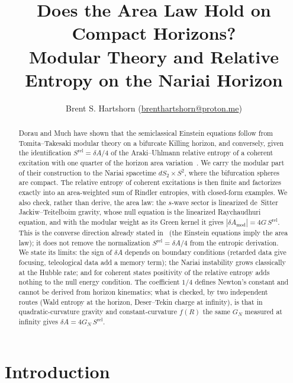 \documentclass[11pt]{article}
\title{\textbf{Does the Area Law Hold on Compact Horizons?}\\ 
Modular Theory and Relative Entropy on the Nariai Horizon}
\author{Brent S. Hartshorn \orcidlink{0009-0004-2853-655X} (\url{brenthartshorn@proton.me})}
\newcommand{\Srel}{S^{\mathrm{rel}}}
\begin{document}
\maketitle

\begin{abstract}
Dorau and Much have shown that the semiclassical Einstein equations follow from Tomita--Takesaki modular theory on a bifurcate Killing horizon, and conversely, given the identification $\Srel = \delta A/4$ of the Araki--Uhlmann relative entropy of a coherent excitation with one quarter of the horizon area variation~\cite{DorauMuch}. We carry the modular part of their construction to the Nariai spacetime $dS_2\times S^2$, where the bifurcation spheres are compact. The relative entropy of coherent excitations is then finite and factorizes exactly into an area-weighted sum of Rindler entropies, with closed-form examples. We also check, rather than derive, the area law: the $s$-wave sector is linearized de~Sitter Jackiw--Teitelboim gravity, whose null equation is the linearized Raychaudhuri equation, and with the modular weight as its Green kernel it gives $|\delta A_{\mathrm{mod}}| = 4G\,\Srel$. This is the converse direction already stated in~\cite{DorauMuch} (the Einstein equations imply the area law); it does not remove the normalization $\Srel = \delta A/4$ from the entropic derivation. We state its limits: the sign of $\delta A$ depends on boundary conditions (retarded data give focusing, teleological data add a memory term); the Nariai instability grows classically at the Hubble rate; and for coherent states positivity of the relative entropy adds nothing to the null energy condition. The coefficient $1/4$ defines Newton's constant and cannot be derived from horizon kinematics; what is checked, by two independent routes (Wald entropy at the horizon, Deser--Tekin charge at infinity), is that in quadratic-curvature gravity and constant-curvature $f(R)$ the same $G_N$ measured at infinity gives $\delta A=4G_N\,\Srel$.
\end{abstract}

\section{Introduction}
\label{sec:intro}
\end{document}
